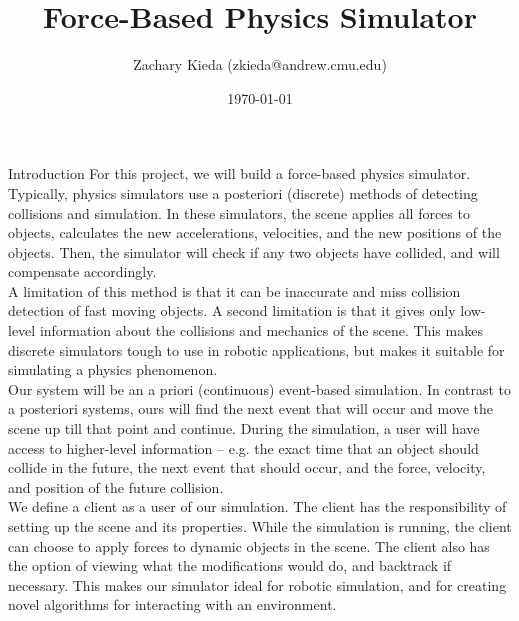 \documentclass[11pt]{article}
\begin{document}
\title{Force-Based Physics Simulator}
\author{Zachary Kieda (zkieda@andrew.cmu.edu)}
\date{\today}
\maketitle

\begin{section}{Introduction}
For this project, we will build a force-based physics simulator. Typically, physics simulators use a posteriori (discrete) methods of detecting collisions and simulation. In these simulators, the scene applies all forces to objects, calculates the new accelerations, velocities, and the new positions of the objects. Then, the simulator will check if any two objects have collided, and will compensate accordingly. \\

A limitation of this method is that it can be inaccurate and miss collision detection of fast moving objects. A second limitation is that it gives only low-level information about the collisions and mechanics of the scene. This makes discrete simulators tough to use in robotic applications, but makes it suitable for simulating a physics phenomenon.\\

Our system will be an a priori (continuous) event-based simulation. In contrast to a posteriori systems, ours will find the next event that will occur and move the scene up till that point and continue. During the simulation, a user will have access to higher-level information -- e.g. the exact time that an object should collide in the future, the next event that should occur, and the force, velocity, and position of the future collision.\\

We define a client as a user of our simulation. The client has the responsibility of setting up the scene and its properties. While the simulation is running, the client can choose to apply forces to dynamic objects in the scene. The client also has the option of viewing what the modifications would do, and backtrack if necessary. This makes our simulator ideal for robotic simulation, and for creating novel algorithms for interacting with an environment.\\
\end{section}
\end{document}
